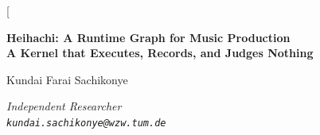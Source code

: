 \documentclass[11pt,twocolumn,a4paper]{article}
\theoremstyle{definition}
\theoremstyle{remark}
\begin{document}
\twocolumn[
\begin{@twocolumnfalse}
\begin{center}

{\LARGE\bfseries Heihachi: A Runtime Graph for Music Production\\[4pt]
A Kernel that Executes, Records, and Judges Nothing}

\vspace{12pt}

{\large Kundai Farai Sachikonye}

\vspace{6pt}

{\small\itshape Independent Researcher \\[0.3em]
\texttt{kundai.sachikonye@wzw.tum.de}}

\vspace{6pt}{\small August 2026}

\vspace{16pt}


\end{center}
\end{@twocolumnfalse}
\end{document}
